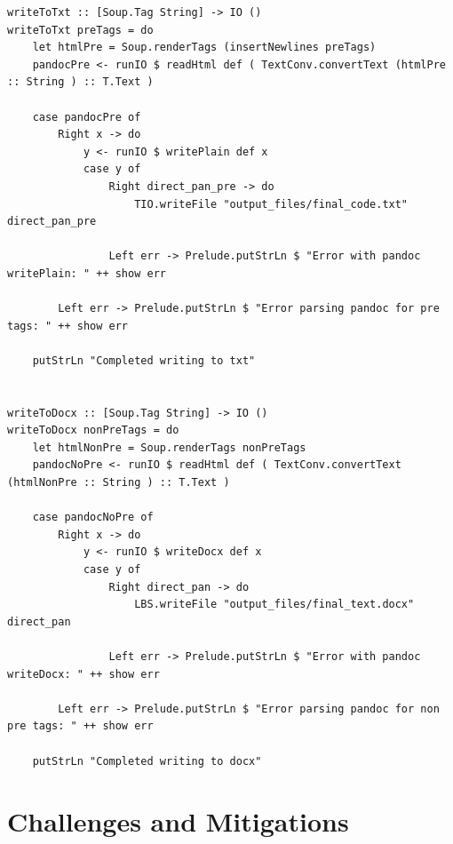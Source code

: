 \documentclass[12pt]{scrreprt}
\begin{document}
\begin{verbatim}
writeToTxt :: [Soup.Tag String] -> IO ()
writeToTxt preTags = do
    let htmlPre = Soup.renderTags (insertNewlines preTags)
    pandocPre <- runIO $ readHtml def ( TextConv.convertText (htmlPre :: String ) :: T.Text )

    case pandocPre of
        Right x -> do
            y <- runIO $ writePlain def x
            case y of
                Right direct_pan_pre -> do
                    TIO.writeFile "output_files/final_code.txt" direct_pan_pre

                Left err -> Prelude.putStrLn $ "Error with pandoc writePlain: " ++ show err

        Left err -> Prelude.putStrLn $ "Error parsing pandoc for pre tags: " ++ show err
    
    putStrLn "Completed writing to txt"


writeToDocx :: [Soup.Tag String] -> IO ()
writeToDocx nonPreTags = do
    let htmlNonPre = Soup.renderTags nonPreTags
    pandocNoPre <- runIO $ readHtml def ( TextConv.convertText (htmlNonPre :: String ) :: T.Text )

    case pandocNoPre of
        Right x -> do
            y <- runIO $ writeDocx def x
            case y of
                Right direct_pan -> do
                    LBS.writeFile "output_files/final_text.docx" direct_pan

                Left err -> Prelude.putStrLn $ "Error with pandoc writeDocx: " ++ show err

        Left err -> Prelude.putStrLn $ "Error parsing pandoc for non pre tags: " ++ show err

    putStrLn "Completed writing to docx"

\end{verbatim}

\newpage


\section{Challenges and Mitigations}
\end{document}
